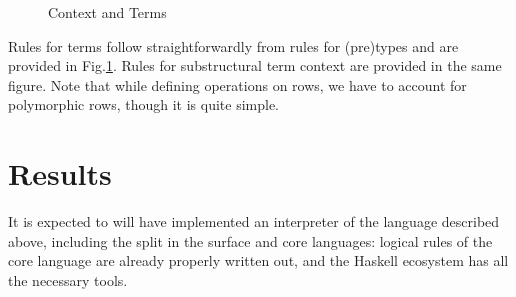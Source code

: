 \documentclass[conference]{IEEEtran}
\begin{document}
\begin{figure}
    \caption{Context and Terms}
    \label{terms}
\end{figure}

Rules for terms follow straightforwardly from rules for (pre)types and are
provided in Fig.\ref{terms}. Rules for substructural term context are provided
in the same figure. Note that while defining operations on rows, we have to
account for polymorphic rows, though it is quite simple.

\section{Results}

It is expected to will have implemented an interpreter of the language described
above, including the split in the surface and core languages: logical rules of
the core language are already properly written out, and the Haskell ecosystem
has all the necessary tools.
\end{document}
